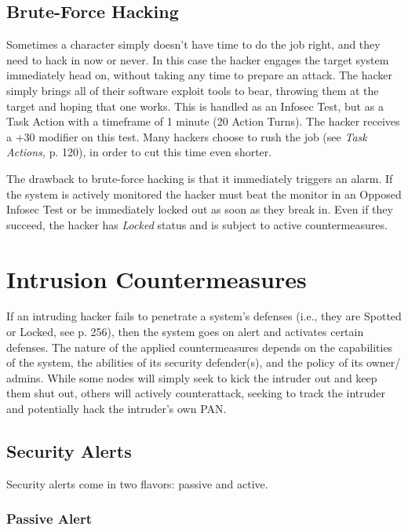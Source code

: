 \subsection{Brute-Force Hacking} 

Sometimes a character simply doesn't have time to do the job right, and they need to hack in now or never. In this case the hacker engages the target system immediately head on, without taking any time to prepare an attack. The hacker simply brings all of their software exploit tools to bear, throwing them at the target and hoping that one works. This is handled as an Infosec Test, but as a Task Action with a timeframe of 1 minute (20 Action Turns). The hacker receives a +30 modifier on this test. Many hackers choose to rush the job (see \textit{Task Actions,} p. 120), in order to cut this time even shorter. 

The drawback to brute-force hacking is that it immediately triggers an alarm. If the system is actively monitored the hacker must beat the monitor in an Opposed Infosec Test or be immediately locked out as soon as they break in. Even if they succeed, the hacker has \textit{Locked} status and is subject to active countermeasures. 



\section{Intrusion Countermeasures} 

If an intruding hacker fails to penetrate a system's defenses (i.e., they are Spotted or Locked, see p. 256), then the system goes on alert and activates certain defenses. The nature of the applied countermeasures depends on the capabilities of the system, the abilities of its security defender(s), and the policy of its owner/ admins. While some nodes will simply seek to kick the intruder out and keep them shut out, others will actively counterattack, seeking to track the intruder and potentially hack the intruder's own PAN. 

\subsection{Security Alerts} 

Security alerts come in two flavors: passive and active. 

\subsubsection{Passive Alert} 

